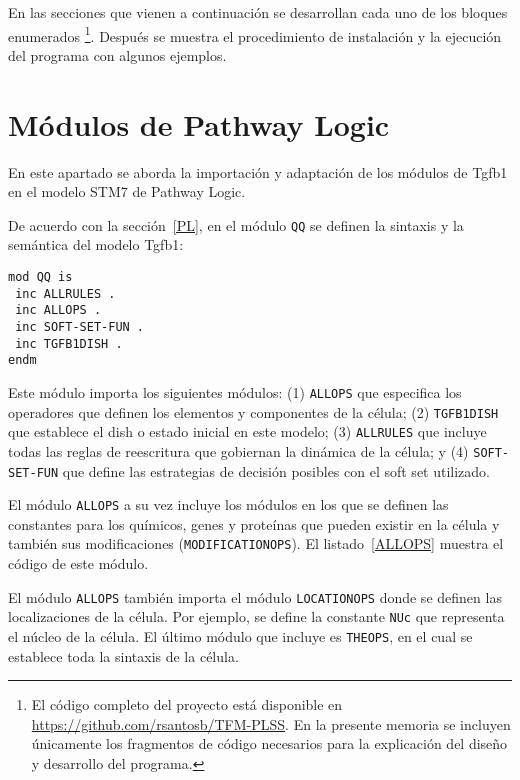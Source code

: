 En las secciones que vienen a continuación se desarrollan cada uno de los bloques enumerados%
\footnote{El código completo del proyecto está disponible en \url{https://github.com/rsantosb/TFM-PLSS}.
En la presente memoria se incluyen únicamente los fragmentos de código necesarios para la explicación del diseño y desarrollo del programa.}.
Después se muestra el procedimiento de instalación y la ejecución del programa con algunos ejemplos.
\smallskip



\medskip


\section{Módulos de Pathway Logic}

En este apartado se aborda la importación y adaptación de los módulos de Tgfb1 en el modelo STM7 de Pathway Logic.
\smallskip

De acuerdo con la sección~\ref{PL}, en el módulo \texttt{QQ} se definen la sintaxis y la semántica del modelo Tgfb1:

\begin{lstlisting}[language=Maude,caption={Módulo \texttt{QQ}}]
mod QQ is
 inc ALLRULES .
 inc ALLOPS .
 inc SOFT-SET-FUN .
 inc TGFB1DISH .
endm
\end{lstlisting}

\noindent
Este módulo importa los siguientes módulos: (1) \texttt{ALLOPS} que especifica los operadores que definen los elementos y componentes de la célula; (2) \texttt{TGFB1DISH}  que establece el dish o estado inicial en este modelo;
(3) \texttt{ALLRULES} que incluye todas las reglas de reescritura que gobiernan la dinámica de la célula; y 
(4) \texttt{SOFT-SET-FUN} que define las estrategias de decisión posibles con el soft set utilizado.
\bigskip

El módulo \texttt{ALLOPS} a su vez incluye los módulos en los que se definen las constantes para los químicos, genes y proteínas que pueden existir en la célula y también sus modificaciones (\texttt{MODIFICATIONOPS}). 
El listado~\ref{ALLOPS} muestra el código de este módulo.

El módulo \texttt{ALLOPS} también importa el módulo \texttt{LOCATIONOPS} donde se definen las localizaciones de la célula. Por ejemplo, se define la constante \texttt{NUc} que representa el núcleo de la célula.
El último módulo que incluye es \texttt{THEOPS}, en el cual se establece toda la sintaxis de la célula.

